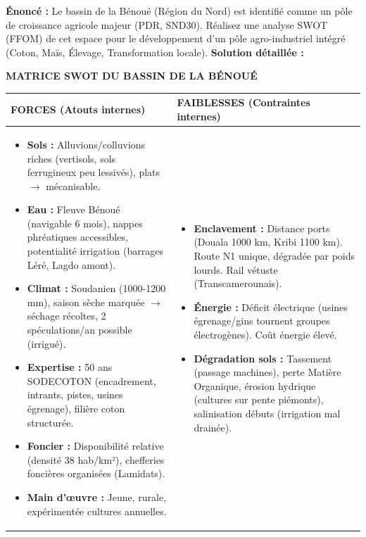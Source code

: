 \documentclass[11pt]{article}
\begin{document}
\begin{exoresolu}
\textbf{Énoncé :} Le bassin de la Bénoué (Région du Nord) est identifié comme un pôle de croissance agricole majeur (PDR, SND30). Réalisez une analyse SWOT (FFOM) de cet espace pour le développement d'un pôle agro-industriel intégré (Coton, Maïs, Élevage, Transformation locale).
\tcblower
\textbf{Solution détaillée :}

\textbf{MATRICE SWOT DU BASSIN DE LA BÉNOUÉ}

\begin{center}
\begin{tabularx}{\linewidth}{|X|X|}\hline
\rowcolor{popblueL} \textbf{FORCES (Atouts internes)} & \textbf{FAIBLESSES (Contraintes internes)} \\ \hline
\begin{itemize}
    \item \textbf{Sols :} Alluvions/colluvions riches (vertisols, sols ferrugineux peu lessivés), plats $\rightarrow$ mécanisable.
    \item \textbf{Eau :} Fleuve Bénoué (navigable 6 mois), nappes phréatiques accessibles, potentialité irrigation (barrages Léré, Lagdo amont).
    \item \textbf{Climat :} Soudanien (1000-1200 mm), saison sèche marquée $\rightarrow$ séchage récoltes, 2 spéculations/an possible (irrigué).
    \item \textbf{Expertise :} 50 ans SODECOTON (encadrement, intrants, pistes, usines égrenage), filière coton structurée.
    \item \textbf{Foncier :} Disponibilité relative (densité 38 hab/km²), chefferies foncières organisées (Lamidats).
    \item \textbf{Main d'œuvre :} Jeune, rurale, expérimentée cultures annuelles.
\end{itemize} & \begin{itemize}
    \item \textbf{Enclavement :} Distance ports (Douala 1000 km, Kribi 1100 km). Route N1 unique, dégradée par poids lourds. Rail vétuste (Transcamerounais).
    \item \textbf{Énergie :} Déficit électrique (usines égrenage/gins tournent groupes électrogènes). Coût énergie élevé.
    \item \textbf{Dégradation sols :} Tassement (passage machines), perte Matière Organique, érosion hydrique (cultures sur pente piémonts), salinisation débuts (irrigation mal drainée).

\end{itemize}
\end{tabularx}
\end{center}
\end{exoresolu}
\end{document}
